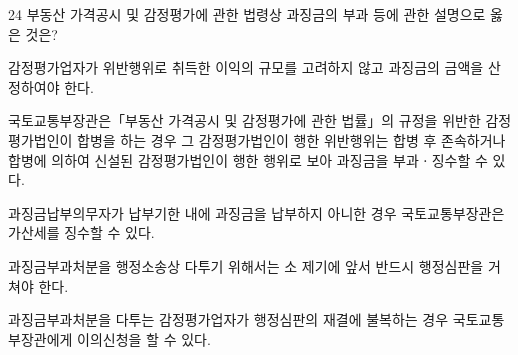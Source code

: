 \begin{question}{24}
부동산 가격공시 및 감정평가에 관한 법령상 과징금의 부과 등에 관한 설명으로 옳은 것은?
\begin{choices}
  \item 감정평가업자가 위반행위로 취득한 이익의 규모를 고려하지 않고 과징금의 금액을 산정하여야 한다.
  \item 국토교통부장관은「부동산 가격공시 및 감정평가에 관한 법률」의 규정을 위반한 감정평가법인이 합병을 하는 경우 그 감정평가법인이 행한 위반행위는 합병 후 존속하거나 합병에 의하여 신설된 감정평가법인이 행한 행위로 보아 과징금을 부과ㆍ징수할 수 있다.
  \item 과징금납부의무자가 납부기한 내에 과징금을 납부하지 아니한 경우 국토교통부장관은 가산세를 징수할 수 있다.
  \item 과징금부과처분을 행정소송상 다투기 위해서는 소 제기에 앞서 반드시 행정심판을 거쳐야 한다.
  \item 과징금부과처분을 다투는 감정평가업자가 행정심판의 재결에 불복하는 경우 국토교통부장관에게 이의신청을 할 수 있다.
\end{choices}
\end{question}
